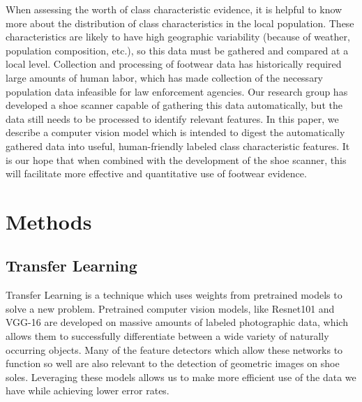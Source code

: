 \documentclass[10pt]{article}
\newcommand{\svp}[1]{{\textcolor{RedOrange}{#1}}}
\begin{document}

\svp{When assessing the worth of class characteristic evidence, it is helpful to know more about the distribution of class characteristics in the local population. These characteristics are likely to have high geographic variability (because of weather, population composition, etc.), so this data must be gathered and compared at a local level. Collection and processing of footwear data has historically required large amounts of human labor, which has made collection of the necessary population data infeasible for law enforcement agencies. Our research group has developed a shoe scanner capable of gathering this data automatically, but the data still needs to be processed to identify relevant features. In this paper, we describe a computer vision model which is intended to digest the automatically gathered data into useful, human-friendly labeled class characteristic features. It is our hope that when combined with the development of the shoe scanner, this will facilitate more effective and quantitative use of footwear evidence.}


\section{Methods}

\subsection{Transfer Learning}
Transfer Learning is a technique \svp{which} uses weights from pretrained models to solve a new problem. Pretrained \svp{computer vision} models, like Resnet101 \svp{and} VGG-16 \svp{are developed} on massive \svp{amounts of labeled photographic} data\svp{, which allows them to successfully differentiate between a wide variety of naturally occurring objects}. \svp{Many of the feature detectors which allow these networks to function so well are also relevant to the detection of geometric images on shoe soles.} \svp{Leveraging} these models \svp{allows us to make more efficient use of the data we have} while achieving lower error rates.
\end{document}
